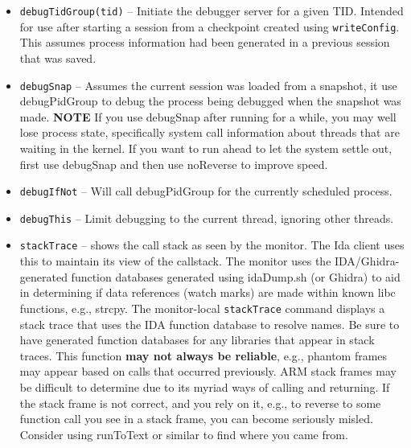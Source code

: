 \documentclass[titlepage]{article}
\begin{document}
\begin{itemize}
Note that the initial execution of a target process may not be the ideal state for a snapshot from which to interact with it, i.e., 
you may want to let the rest of the system initialize and settle out.  To achieve that, use noReverse() to disable reversing and then run forward until the
Simics \textit{ptime} command reflects that the system is not bogged down with initialization.  Then create your snapshot.  The state of the snapshot may not 
have the target process scheduled,  but when you subsequently run debugSnap (see below), it will run forward to your process.  If your process is blocked in
the kernel waiting for input, you may need to provide that input to see your process scheduled so that you can issue commands.

\item {\tt debugTidGroup(tid)} -- Initiate the debugger server for a given TID.  Intended for use after starting a session from a checkpoint created using
{\tt writeConfig}.  This assumes process information had been generated in a previous session that was saved.  

\item {\tt debugSnap} -- Assumes the current session was loaded from a snapshot, it use debugPidGroup to debug the process being debugged when the snapshot was made.
\textbf{NOTE} If you use debugSnap after running for a while, you may well lose process state, specifically system call information about 
threads that are waiting in the kernel.  If you want to run ahead to let the system settle out, first use debugSnap and then use noReverse to improve speed.

\item {\tt debugIfNot} -- Will call debugPidGroup for the currently scheduled process.

\item {\tt debugThis} -- Limit debugging to the current thread, ignoring other threads.

\item {\tt stackTrace} – shows the call stack as seen by the monitor.  The Ida client uses this to maintain its view of the callstack.  The monitor
uses the IDA/Ghidra-generated function databases generated using idaDump.sh (or Ghidra) to aid in determining if 
data references (watch marks) are made within known libc functions, e.g., strcpy.  The monitor-local {\tt stackTrace} command displays a
stack trace that uses the IDA function database to resolve names.  Be sure to have generated function databases for any libraries that appear in stack traces.
This function \textbf{may not always be reliable}, e.g., phantom frames may appear based on calls that occurred previously. ARM stack frames may be
difficult to determine due to its myriad ways of calling and returning. If the stack frame is not correct, and you rely on it, e.g., to reverse to some function
call you see in a stack frame, you can become seriously misled.  Consider using runToText or similar to find where you came from.


\end{itemize}
\end{document}
